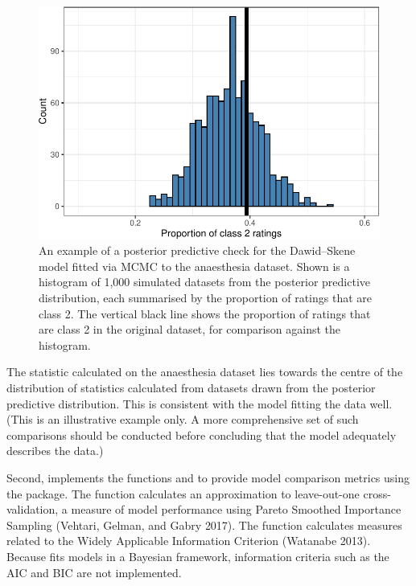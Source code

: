 \begin{figure}

{\centering \includegraphics{rater_files/figure-latex/plot-ppcs-1} 

}

\caption{An example of a posterior predictive check for the Dawid--Skene model fitted via MCMC to the anaesthesia dataset.  Shown is a histogram of 1,000 simulated datasets from the posterior predictive distribution, each summarised by the proportion of ratings that are class 2.  The vertical black line shows the proportion of ratings that are class 2 in the original dataset, for comparison against the histogram.}\label{fig:plot-ppcs}
\end{figure}

The statistic calculated on the anaesthesia dataset lies towards the centre of
the distribution of statistics calculated from datasets drawn from the
posterior predictive distribution. This is consistent with the model fitting
the data well. (This is an illustrative example only. A more comprehensive
set of such comparisons should be conducted before concluding that the model
adequately describes the data.)

Second,  implements the functions  and 
to provide model comparison metrics using the  package. The
function  calculates an approximation to leave-out-one
cross-validation, a measure of model performance using Pareto Smoothed
Importance Sampling (Vehtari, Gelman, and Gabry 2017). The function  calculates
measures related to the Widely Applicable Information Criterion
(Watanabe 2013). Because  fits models in a Bayesian
framework, information criteria such as the AIC and BIC are not implemented.

